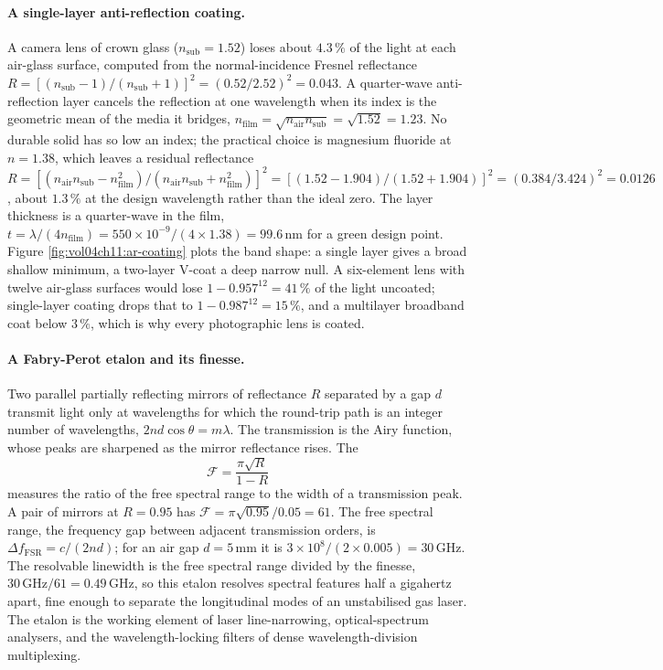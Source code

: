 \paragraph{A single-layer anti-reflection coating.} A camera lens of
crown glass ($n_{\text{sub}} = 1.52$) loses about $4.3\,\%$ of the light at
each air-glass surface, computed from the normal-incidence Fresnel
reflectance $R = [(n_{\text{sub}}-1)/(n_{\text{sub}}+1)]^{2} =
(0.52/2.52)^{2} = 0.043$. A quarter-wave anti-reflection layer cancels the
reflection at one wavelength when its index is the geometric mean of the
media it bridges, $n_{\text{film}} = \sqrt{n_{\text{air}}n_{\text{sub}}} =
\sqrt{1.52} = 1.23$. No durable solid has so low an index; the practical
choice is magnesium fluoride at $n = 1.38$, which leaves a residual
reflectance $R = [(n_{\text{air}}n_{\text{sub}} - n_{\text{film}}^{2})/
(n_{\text{air}}n_{\text{sub}} + n_{\text{film}}^{2})]^{2} = [(1.52 - 1.904)/
(1.52 + 1.904)]^{2} = (0.384/3.424)^{2} = 0.0126$, about $1.3\,\%$ at the
design wavelength rather than the ideal zero. The layer thickness is a
quarter-wave in the film, $t = \lambda/(4 n_{\text{film}}) = 550\times
10^{-9}/(4\times 1.38) = 99.6\,\si{\nano\meter}$ for a green design point.
Figure \ref{fig:vol04ch11:ar-coating} plots the band shape: a single layer
gives a broad shallow minimum, a two-layer V-coat a deep narrow null. A
six-element lens with twelve air-glass surfaces would lose
$1 - 0.957^{12} = 41\,\%$ of the light uncoated; single-layer coating drops
that to $1 - 0.987^{12} = 15\,\%$, and a multilayer broadband coat below
$3\,\%$, which is why every photographic lens is coated.



\paragraph{A Fabry-Perot etalon and its finesse.} Two parallel partially
reflecting mirrors of reflectance $R$ separated by a gap $d$ transmit light
only at wavelengths for which the round-trip path is an integer number of
wavelengths, $2 n d\cos\theta = m\lambda$. The transmission is the Airy
function, whose peaks are sharpened as the mirror reflectance rises. The
\[
\mathcal{F} = \frac{\pi\sqrt{R}}{1 - R}
\]
measures the ratio of the free spectral range to the width of a transmission
peak. A pair of mirrors at $R = 0.95$ has $\mathcal{F} = \pi\sqrt{0.95}/0.05
= 61$. The free spectral range, the frequency gap between adjacent
transmission orders, is $\Delta f_{\text{FSR}} = c/(2 n d)$; for an air gap
$d = 5\,\si{\milli\meter}$ it is $3\times10^{8}/(2\times 0.005) =
30\,\si{\giga\hertz}$. The resolvable linewidth is the free spectral range
divided by the finesse, $30\,\si{\giga\hertz}/61 = 0.49\,\si{\giga\hertz}$,
so this etalon resolves spectral features half a gigahertz apart, fine
enough to separate the longitudinal modes of an unstabilised gas laser. The
etalon is the working element of laser line-narrowing, optical-spectrum
analysers, and the wavelength-locking filters of dense wavelength-division
multiplexing.

